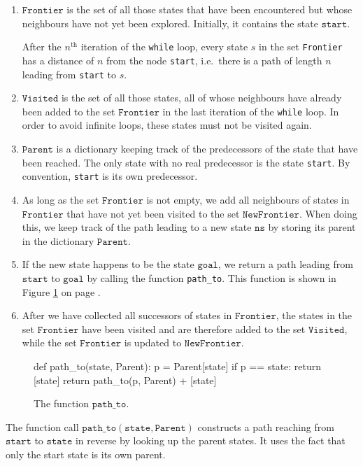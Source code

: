 \begin{enumerate}
\item $\texttt{Frontier}$ is the set of all those states that have been encountered but whose
      neighbours have not yet been explored.  Initially, it contains the state $\texttt{start}$.

      After the $n^\textrm{th}$ iteration of the \texttt{while} loop, every state $s$ in the set
      \texttt{Frontier} has a distance of $n$ from the node \texttt{start}, i.e.~there is a path of length $n$
      leading from \texttt{start} to $s$.
\item $\texttt{Visited}$ is the set of all those states, all of whose neighbours have already been
      added to the set $\texttt{Frontier}$ in the last iteration of the \texttt{while} loop.  In order to avoid
      infinite loops, these states must not be visited again.
\item $\texttt{Parent}$ is a dictionary keeping track of the predecessors of the state that have been reached.
      The only state with no real predecessor is the state \texttt{start}.  By convention, \texttt{start} is its
      own predecessor.
\item As long as the set $\texttt{Frontier}$ is not empty, we add all neighbours of states in
      $\texttt{Frontier}$ that have not yet been visited to the set $\texttt{NewFrontier}$.
      When doing this, we keep track of the path leading to a new state $\texttt{ns}$ by storing its
      parent in the dictionary $\texttt{Parent}$.
\item If the new state happens to be the state $\texttt{goal}$, we return a path leading from
      $\texttt{start}$ to $\texttt{goal}$ by calling the function \texttt{path\_to}.  This function is shown in Figure
      \ref{fig:pathTo.py} on page \pageref{fig:pathTo.py}.
\item After we have collected all successors of states in $\texttt{Frontier}$, the states
      in the set $\texttt{Frontier}$ have been visited and are therefore added to the set
      $\texttt{Visited}$, while the set $\texttt{Frontier}$ is updated to $\texttt{NewFrontier}$.
\end{enumerate}

\begin{figure}[!ht]
\centering
\begin{python3code}
    def path_to(state, Parent):
        p = Parent[state]
        if p == state:
            return [state]
        return path_to(p, Parent) + [state]
\end{python3code}
\vspace*{-0.3cm}
\caption{The function $\texttt{path\_to}$.}
\label{fig:pathTo.py}
\end{figure}
The function call $\mathtt{path\_to}(\mathtt{state}, \mathtt{Parent})$ constructs a path reaching
from $\texttt{start}$ to $\texttt{state}$ in reverse by looking up the parent states.  It uses the fact that
only the start state is its own parent.

